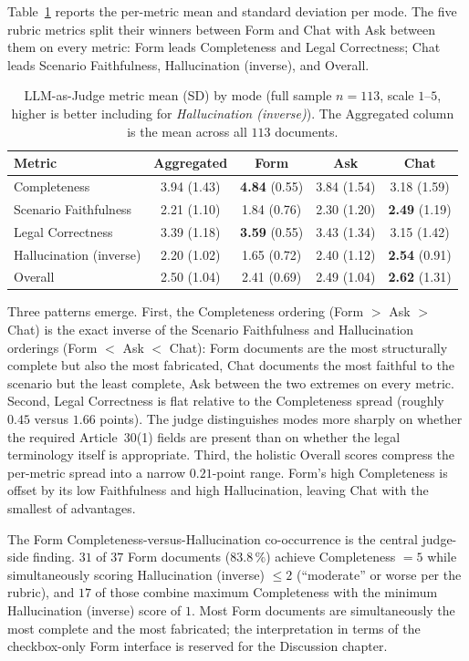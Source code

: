 Table~\ref{tab:judge-summary} reports the per-metric mean and
standard deviation per mode. The five rubric metrics split their
winners between Form and Chat with Ask between them on every
metric: Form leads Completeness and Legal Correctness; Chat leads
Scenario Faithfulness, Hallucination (inverse), and Overall.

\begin{table}[htbp]
\centering
\caption{LLM-as-Judge metric mean (SD) by mode (full sample
$n = 113$, scale $1$--$5$, higher is better including for
\emph{Hallucination (inverse)}). The Aggregated column is the
mean across all $113$ documents.}
\label{tab:judge-summary}
\begin{tabular}{@{}l c c c c@{}}
\toprule
Metric & Aggregated & Form & Ask & Chat \\
\midrule
Completeness            & 3.94 (1.43) & \textbf{4.84} (0.55) & 3.84 (1.54) & 3.18 (1.59) \\
Scenario Faithfulness   & 2.21 (1.10) & 1.84 (0.76) & 2.30 (1.20) & \textbf{2.49} (1.19) \\
Legal Correctness       & 3.39 (1.18) & \textbf{3.59} (0.55) & 3.43 (1.34) & 3.15 (1.42) \\
Hallucination (inverse) & 2.20 (1.02) & 1.65 (0.72) & 2.40 (1.12) & \textbf{2.54} (0.91) \\
Overall                 & 2.50 (1.04) & 2.41 (0.69) & 2.49 (1.04) & \textbf{2.62} (1.31) \\
\bottomrule
\end{tabular}
\end{table}

Three patterns emerge. First, the Completeness ordering (Form
$>$ Ask $>$ Chat) is the exact inverse of the Scenario
Faithfulness and Hallucination orderings (Form $<$ Ask $<$ Chat):
Form documents are the most structurally complete but also the
most fabricated, Chat documents the most faithful to the scenario
but the least complete, Ask between the two extremes on every
metric. Second, Legal Correctness is flat relative to the
Completeness spread (roughly $0.45$ versus $1.66$ points). The
judge distinguishes modes more sharply on whether the required
Article~30(1) fields are present than on whether the legal
terminology itself is appropriate. Third, the holistic Overall
scores compress the per-metric spread into a narrow $0.21$-point
range. Form's high Completeness is offset by its low Faithfulness
and high Hallucination, leaving Chat with the smallest of
advantages.

The Form Completeness-versus-Hallucination co-occurrence is the
central judge-side finding. $31$ of $37$ Form documents
($83.8\,\%$) achieve Completeness $= 5$ while simultaneously
scoring Hallucination (inverse) $\leq 2$ (``moderate'' or worse
per the rubric), and $17$ of those combine maximum Completeness
with the minimum Hallucination (inverse) score of $1$. Most Form
documents are simultaneously the most complete and the most
fabricated; the interpretation in terms of the checkbox-only Form
interface is reserved for the Discussion chapter.

